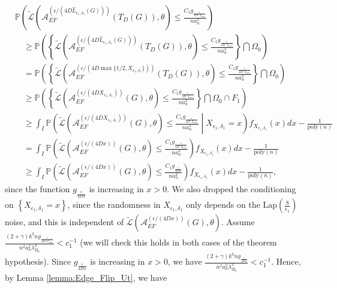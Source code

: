 \documentclass{article}
\begin{document}
\begin{align*}
&\mathbb{P}\left(\widetilde{\mathcal{L}}\left(\mathcal{A}_{EF}^{\left(\epsilon/(4D\hat{L}_{\epsilon_1, \delta_1}(G))\right)}(T_{D}(G)), \theta\right) \leq \frac{C_1g_{\frac{\epsilon}{4D\cdot I_{max}}}}{na_n^2}\right)\\
& \quad \geq \mathbb{P}\left(\left\{\widetilde{\mathcal{L}}\left(\mathcal{A}_{EF}^{\left(\epsilon/(4D\hat{L}_{\epsilon_1, \delta_1}(G))\right)}(T_{D}(G)), \theta\right) \leq \frac{C_1g_{\frac{\epsilon}{4D\cdot I_{max}}}}{na_n^2}\right\} \bigcap \Omega_0\right)\\
& \quad = \mathbb{P}\left(\left\{\widetilde{\mathcal{L}}\left(\mathcal{A}_{EF}^{\left(\epsilon/(4D\max\{1/2, X_{\epsilon_1, \delta_1}\})\right)}(T_{D}(G)), \theta\right) \leq \frac{C_1g_{\frac{\epsilon}{4D\cdot I_{max}}}}{na_n^2}\right\} \bigcap \Omega_0\right) \\
& \quad \geq \mathbb{P}\left(\left\{\widetilde{\mathcal{L}}\left(\mathcal{A}_{EF}^{\left(\epsilon/(4DX_{\epsilon_1, \delta_1})\right)}(G), \theta\right) \leq \frac{C_1g_{\frac{\epsilon}{4D\cdot I_{max}}}}{na_n^2}\right\} \bigcap \Omega_0 \cap F_1\right)\\
& \quad \geq \int_I\mathbb{P}\left(\widetilde{\mathcal{L}}\left(\mathcal{A}_{EF}^{\left(\epsilon/(4DX_{\epsilon_1, \delta_1})\right)}(G), \theta\right) \leq \frac{C_1g_{\frac{\epsilon}{4D\cdot I_{max}}}}{na_n^2}\middle\vert X_{\epsilon_1, \delta_1} = x\right)f_{X_{\epsilon_1, \delta_1}}(x)dx - \frac{1}{\mathrm{poly}(n)}\\
& \quad = \int_I\mathbb{P}\left(\widetilde{\mathcal{L}}\left(\mathcal{A}_{EF}^{\left(\epsilon/(4Dx)\right)}(G), \theta\right) \leq \frac{C_1g_{\frac{\epsilon}{4D\cdot I_{max}}}}{na_n^2}\right)f_{X_{\epsilon_1, \delta_1}}(x)dx - \frac{1}{\mathrm{poly}(n)}\\
& \quad \geq \int_I\mathbb{P}\left(\widetilde{\mathcal{L}}\left(\mathcal{A}_{EF}^{\left(\epsilon/(4Dx)\right)}(G), \theta\right) \leq \frac{C_1g_{\frac{\epsilon}{4Dx}}}{na_n^2}\right)f_{X_{\epsilon_1, \delta_1}}(x)dx - \frac{1}{\mathrm{poly}(n)},
\end{align*}
since the function $g_{\frac{\epsilon}{4Dx}}$ is increasing in $x > 0$. We also dropped the conditioning on $\left\{X_{\epsilon_1, \delta_1} = x\right\}$, since the randomness in $X_{\epsilon_1, \delta_1}$ only depends on the $\mathrm{Lap}\left(\frac{8}{\epsilon_1}\right)$ noise, and this is independent of $\widetilde{\mathcal{L}}\left(\mathcal{A}_{EF}^{(\epsilon/(4Dx))}(G), \theta\right)$. Assume $\frac{(2 + \gamma)k^3ng_{\frac{\epsilon}{4D\cdot I_{max}}}}{n^2a_n^2\lambda_{B_0}^2} < c_1^{-1}$ (we will check this holds in both cases of the theorem hypothesis). Since $g_{\frac{\epsilon}{4Dx}}$ is increasing in $x > 0$, we have $\frac{(2 + \gamma)k^3ng_{\frac{\epsilon}{4Dx}}}{n^2a_n^2\lambda_{B_0}^2} < c_1^{-1}$. Hence, by Lemma \ref{lemma:Edge_Flip_Ut}, we have 
\end{document}
